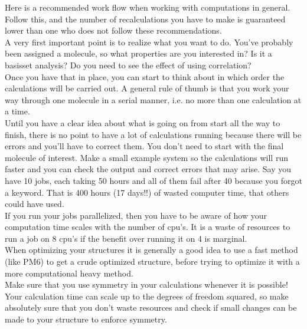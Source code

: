 \documentclass{article}
\begin{document}


Here is a recommended work flow when working with computations in general.
Follow this, and the number of recalculations you have to make is guaranteed lower than one who does not follow these recommendations.\\

A very first important point is to realize what you want to do.
You've probably been assigned a molecule, so what properties are you interested in?
Is it a basisset analysis?
Do you need to see the effect of using correlation?\\

Once you have that in place, you can start to think about in which order the calculations will be carried out.
A general rule of thumb is that you work your way through one molecule in a serial manner, i.e. no more than one calculation at a time.\\

Until you have a clear idea about what is going on from start all the way to finish, there is no point to have a lot of calculations running because there will be errors and you'll have to correct them.
You don't need to start with the final molecule of interest.
Make a small example system so the calculations will run faster and you can check the output and correct errors that may arise.
Say you have 10 jobs, each taking 50 hours and all of them fail after 40 because you forgot a keyword.
That is 400 hours (17 days!!) of wasted computer time, that others could have used.\\

If you run your jobs parallelized, then you have to be aware of how your computation time scales with the number of cpu's.
It is a waste of resources to run a job on 8 cpu's if the benefit over running it on 4 is marginal.\\

When optimizing your structures it is generally a good idea to use a fast method (like PM6) to get a crude optimized structure, before trying to optimize it with a more computational heavy method.\\

Make sure that you use symmetry in your calculations whenever it is possible!
Your calculation time can scale up to the degrees of freedom squared, so make absolutely sure that you don't waste resources and check if small changes can be made to your structure to enforce symmetry.\\
\end{document}
